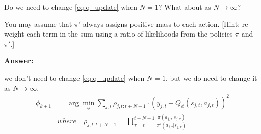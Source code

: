 Do we need to change \eqref{eq:q_update} when $N=1$? What about as $N\to\infty$? 

You may assume that $\pi'$ always assigns positive mass to each action. [Hint: re-weight each term in the sum using a ratio of likelihoods from the policies $\pi$ and $\pi'$.]

 
\ifsolutions\solve\thesubsection\else
\textbf{Answer:}

we don't need to change \eqref{eq:q_update} when $N=1$, but we do need to change it as $N\to\infty$.
$$
\begin{aligned}
\phi_{k+1} &= \arg\min_\phi \sum_{j,t} \rho_{j,t:t+N-1} \cdot (y_{j,t} - Q_\phi(s_{j,t}, a_{j,t}))^2 \\
& where  \quad \rho_{j,t:t+N-1} = \prod_{\tau = t}^{t+N-1} \frac{\pi(a_{j,\tau} | s_{j,\tau})}{\pi'(a_{j,\tau} | s_{j,\tau})}
\end{aligned}
$$
\fi

\endgroup
